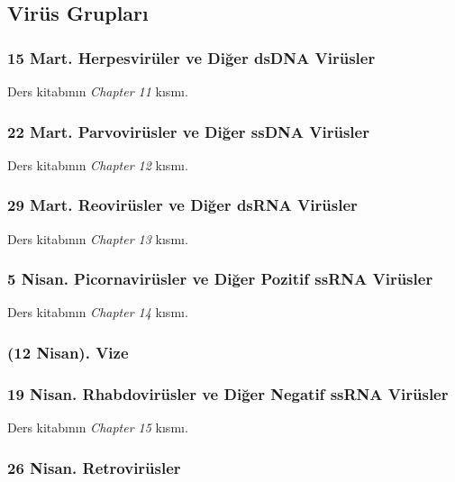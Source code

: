 \subsection{Virüs Grupları}\label{viruxfcs-gruplarux131}

\subsubsection{15 Mart. Herpesvirüler ve Diğer dsDNA
Virüsler}\label{mart.-herpesviruxfcler-ve-diux11fer-dsdna-viruxfcsler}

Ders kitabının \emph{Chapter 11} kısmı.

\subsubsection{22 Mart. Parvovirüsler ve Diğer ssDNA
Virüsler}\label{mart.-parvoviruxfcsler-ve-diux11fer-ssdna-viruxfcsler}

Ders kitabının \emph{Chapter 12} kısmı.

\subsubsection{29 Mart. Reovirüsler ve Diğer dsRNA
Virüsler}\label{mart.-reoviruxfcsler-ve-diux11fer-dsrna-viruxfcsler}

Ders kitabının \emph{Chapter 13} kısmı.

\subsubsection{5 Nisan. Picornavirüsler ve Diğer Pozitif ssRNA
Virüsler}\label{nisan.-picornaviruxfcsler-ve-diux11fer-pozitif-ssrna-viruxfcsler}

Ders kitabının \emph{Chapter 14} kısmı.

\subsubsection{(12 Nisan). Vize}\label{nisan.-vize}

\subsubsection{19 Nisan. Rhabdovirüsler ve Diğer Negatif ssRNA
Virüsler}\label{nisan.-rhabdoviruxfcsler-ve-diux11fer-negatif-ssrna-viruxfcsler}

Ders kitabının \emph{Chapter 15} kısmı.

\subsubsection{26 Nisan. Retrovirüsler}\label{nisan.-retroviruxfcsler}

